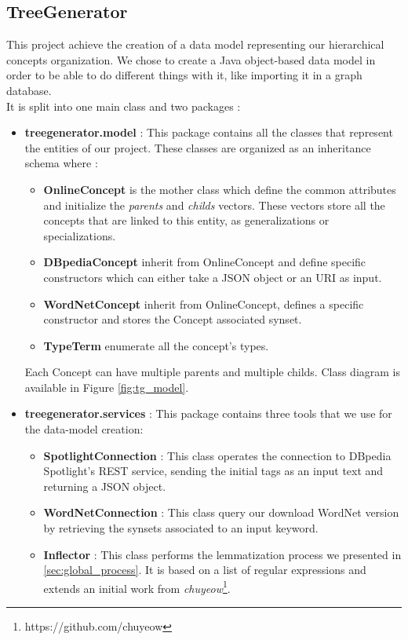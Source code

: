 \subsection{TreeGenerator} %
\label{sub:treegenerator}
This project achieve the creation of a data model representing our hierarchical concepts organization. We chose to create a Java object-based data model in order to be able to do different things with it, like importing it in a graph database.\\
It is split into one main class and two packages : 
\begin{itemize}
	\item \textbf{treegenerator.model} : This package contains all the classes that represent the entities of our project. These classes are organized as an inheritance schema where :
	\begin{itemize}
		\item \textbf{OnlineConcept} is the mother class which define the common attributes and initialize the \emph{parents} and \emph{childs} vectors. These vectors store all the concepts that are linked to this entity, as generalizations or specializations.
		\item \textbf{DBpediaConcept} inherit from OnlineConcept and define specific constructors which can either take a JSON object or an URI as input.
		\item \textbf{WordNetConcept} inherit from OnlineConcept, defines a specific constructor and stores the Concept associated synset.
		\item \textbf{TypeTerm} enumerate all the concept's types.
	\end{itemize}
	Each Concept can have multiple parents and multiple childs. Class diagram is available in Figure \ref{fig:tg_model}.
	\item \textbf{treegenerator.services} : This package contains three tools that we use for the data-model creation: 
	\begin{itemize}
		\item \textbf{SpotlightConnection} : This class operates the connection to DBpedia Spotlight's REST service, sending the initial tags as an input text and returning a JSON object.
		\item \textbf{WordNetConnection} : This class query our download WordNet version by retrieving the synsets associated to an input keyword.
		\item \textbf{Inflector} : This class performs the lemmatization process we presented in \ref{sec:global_process}. It is based on a list of regular expressions and extends an initial work from \emph{chuyeow}\footnote{https://github.com/chuyeow}.

\end{itemize}
\end{itemize}
